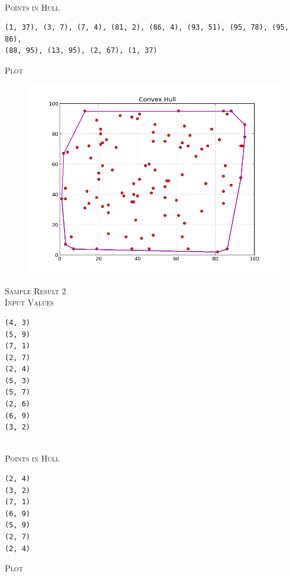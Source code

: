 \documentclass[pdftex,12pt,a4paper]{article}
\newcommand{\nspace}{\\[0.25cm]}
\begin{document}
\hfill \nspace
\textsc{Points in Hull} \hfill \nspace

\begin{verbatim}
(1, 37), (3, 7), (7, 4), (81, 2), (86, 4), (93, 51), (95, 78), (95, 86), 
(88, 95), (13, 95), (2, 67), (1, 37)
\end{verbatim}

\newpage
\textsc{Plot} \hfill \nspace

\begin{figure}[h!]
  \centering
	\includegraphics[scale=0.65]{img/monotone_test_1.png}
\end{figure}



\textsc{\large Sample Result 2} \hfill \nspace

\textsc{Input Values} \hfill \nspace

\begin{verbatim}
(4, 3)
(5, 9)
(7, 1)
(2, 7)
(2, 4)
(5, 3)
(5, 7)
(2, 6)
(6, 9)
(3, 2)
\end{verbatim}

\hfill \nspace
\textsc{Points in Hull} \hfill \nspace

\begin{verbatim}
(2, 4)
(3, 2)
(7, 1)
(6, 9)
(5, 9)
(2, 7)
(2, 4)
\end{verbatim}

\newpage
\textsc{Plot} \hfill \nspace
\end{document}
